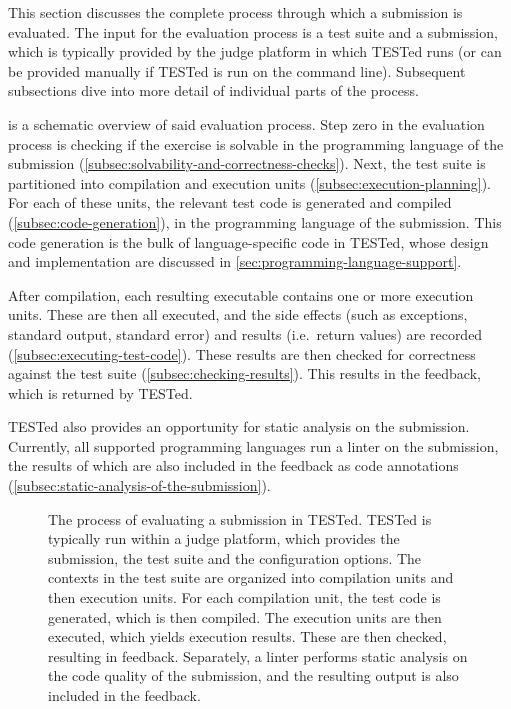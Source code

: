 \documentclass[../main]{subfiles}
\begin{document}
This section discusses the complete process through which a submission is evaluated.
The input for the evaluation process is a test suite and a submission, which is typically provided by the judge platform in which TESTed runs (or can be provided manually if TESTed is run on the command line).
Subsequent subsections dive into more detail of individual parts of the process.

 is a schematic overview of said evaluation process.
Step zero in the evaluation process is checking if the exercise is solvable in the programming language of the submission (\cref{subsec:solvability-and-correctness-checks}).
Next, the test suite is partitioned into compilation and execution units (\cref{subsec:execution-planning}).
For each of these units, the relevant test code is generated and compiled (\cref{subsec:code-generation}), in the programming language of the submission.
This code generation is the bulk of language-specific code in TESTed, whose design and implementation are discussed in \cref{sec:programming-language-support}.

After compilation, each resulting executable contains one or more execution units.
These are then all executed, and the side effects (such as exceptions, standard output, standard error) and results (i.e.\ return values) are recorded (\cref{subsec:executing-test-code}).
These results are then checked for correctness against the test suite (\cref{subsec:checking-results}).
This results in the feedback, which is returned by TESTed.

TESTed also provides an opportunity for static analysis on the submission.
Currently, all supported programming languages run a linter on the submission, the results of which are also included in the feedback as code annotations (\cref{subsec:static-analysis-of-the-submission}).

\begin{figure}
    \centering
    
    \caption{
        The process of evaluating a submission in TESTed.
        TESTed is typically run within a judge platform, which provides the submission, the test suite and the configuration options.
        The contexts in the test suite are organized into compilation units and then execution units.
        For each compilation unit, the test code is generated, which is then compiled.
        The execution units are then executed, which yields execution results. These are then checked, resulting in feedback.
        Separately, a linter performs static analysis on the code quality of the submission, and the resulting output is also included in the feedback.
    }
    \label{fig:flow}
\end{figure}
\end{document}
